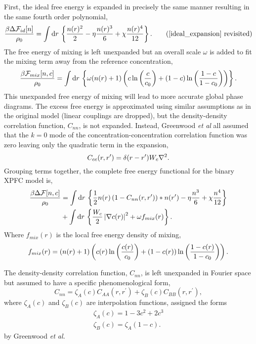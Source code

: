 First, the ideal free energy is expanded in precisely the same manner resulting
in the same fourth order polynomial,
%
\begin{equation}
    \f{\beta\Delta\F_{id}[n]}{\rho_0} = \integrate{r}
        \l\lbrace \f{n(r)^2}{2} - \eta \f{n(r)^3}{6} + \chi\f{n(r)^4}{12}
        \r\rbrace. \tag{\ref{ideal_expansion} revisited}
\end{equation}
%
The free energy of mixing is left unexpanded but an overall scale $\omega$ is
added to fit the mixing term away from the reference concentration,
%
\begin{equation}
    \frac{\beta\mathcal{F}_{mix}[n, c]}{\rho_0} =
        \int \mathrm{d}r\, \left\lbrace \omega (n(r) + 1)\left( 
            c\ln\left(\frac{c}{c_0}\right) + (1-c)\ln\left(\frac{1-c}{1-c_0}\right) \right)\right\rbrace. 
\end{equation}
%
This unexpanded free energy of mixing will lead to more accurate global phase
diagrams. The excess free energy is approximated using similar assumptions as
in the original model (linear couplings are dropped), but the density-density
correlation function, $C_{nn}$, is not expanded. Instead, Greenwood \textit{et
al} all assumed that the $k=0$ mode of the concentration-concentration
correlation function was zero leaving only the quadratic term in the expansion,
%
\begin{equation}
    C_{cc}(r, r^\prime) = \delta(r - r^\prime)W_c \nabla^2.
\end{equation}
%
Grouping terms together, the complete free energy functional for the binary
XPFC model is,
%
\begin{align}
    \frac{\beta\Delta\mathcal{F}[n, c]}{\rho_0} &= \int \mathrm{d}r\, \left\lbrace
        \frac{1}{2} n(r) \left(1 - C_{nn}(r, r^\prime)\right) \ast n(r^\prime)
        - \eta \frac{n^3}{6} + \chi \frac{n^4}{12} \right\rbrace \\
        &+ \int \mathrm{d}r\,\left\lbrace
            \frac{W_c}{2}\left\vert \nabla c(r) \right\vert^2 + \omega f_{mix}(r)
            \right\rbrace. \nonumber
\end{align}
%
Where $f_{mix}(r)$ is the local free energy density of mixing,
%
\begin{equation}
    f_{mix}(r) = \left(n(r) + 1\right)\left( 
            c(r)\ln\left(\frac{c(r)}{c_0}\right) + (1-c(r))\ln\left(\frac{1-c(r)}{1-c_0}\right) \right).
\end{equation}
%

The density-density correlation function, $C_{nn}$, is left unexpanded in 
Fourier space but assumed to have a specific phenomenological form,
%
\begin{equation}
    \label{eq:xpfc_corr}
    C_{nn} = \zeta_A(c) C_{AA}(r, r^\prime) 
           + \zeta_B(c) C_{BB}(r, r^\prime),
\end{equation}
%
where $\zeta_A(c)$ and $\zeta_B(c)$ are interpolation functions, assigned the forms
%
\begin{gather}
    \zeta_A(c) = 1 - 3c^2 + 2c^3 \\
    \zeta_B(c) = \zeta_A(1 - c).
\end{gather}
%
by Greenwood \textit{et al.}

